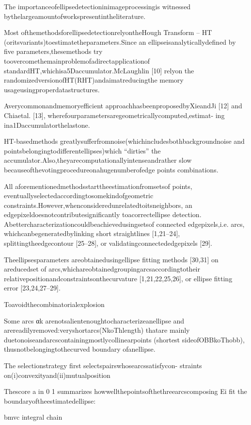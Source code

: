 \documentclass[a4paper]{report}
\begin{document}
The importanceofellipsedetectioninimageprocessingis
witnessed bythelargeamountofworkspresentintheliterature.

Most ofthemethodsforellipsedetectionrelyontheHough
Transform – HT (oritsvariants)toestimatetheparameters.Since
an ellipseisanalyticallydefined by five parameters,thesemethods
try toovercomethemainproblemofadirectapplicationof
standardHT,whichisa5Daccumulator.McLaughlin [10] relyon
the randomizedversionofHT(RHT)andaimatreducingthe
memory usageusingproperdatastructures.

Averycommonandmemoryefficient
approachhasbeenproposedbyXieandJi [12] and Chiaetal.
[13], wherefourparametersaregeometricallycomputed,estimat-
ing ina1Daccumulatorthelastone.

HT-basedmethods
greatlysufferfromnoise(whichincludesbothbackgroundnoise
and pointsbelongingtodifferentellipses)which “dirties” the
accumulator.Also,theyarecomputationallyintenseandrather
slow becauseofthevotingprocedureonahugenumberofedge
points combinations.

All aforementionedmethodsstarttheestimationfromsetsof
points, eventuallyselectedaccordingtosomekindofgeometric
constraints.However,whenconsideredunrelatedtoitsneighbors,
an edgepixeldoesnotcontributesignificantly toacorrectellipse
detection. Abettercharacterizationcouldbeachievedusingsetsof
connected edgepixels,i.e. arcs, whichcanbegeneratedbylinking
short straightlines [1,21–24], splittingtheedgecontour [25–28],
or validatingconnectededgepixels [29].

Theellipsesparameters
areobtainedusingellipse fitting methods [30,31] on areducedset
of arcs,whichareobtainedgroupingarcsaccordingtotheir
relativepositionandconstraintsonthecurvature [1,21,22,25,26],
or ellipse fitting error [23,24,27–29].

Toavoidthecombinatorialexplosion

Some arcs αk arenotsalientenoughtocharacterizeanellipse
and arereadilyremoved:veryshortarcs(NkoThlength) thatare
mainly duetonoiseandarcscontainingmostlycollinearpoints
(shortest sideofOBBkoThobb), thusnotbelongingtothecurved
boundary ofanellipse.

The selectionstrategy first selectspairswhosearcssatisfycon-
straints on(i)convexityand(ii)mutualposition


Thescore a in 0 1
summarizes howwellthepointsofthethreearcscomposing Ei fit
the boundaryoftheestimatedellipse:

bmvc integral chain
\end{document}
